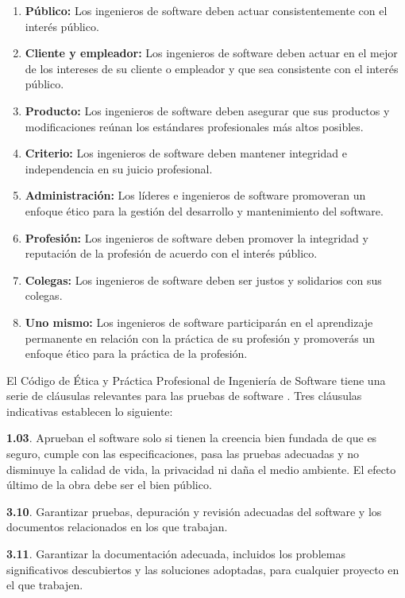 \documentclass[twoside]{article}
\begin{document}
\begin{multicols}{2}
\begin{enumerate}
\item \textbf{Público:} Los ingenieros de software deben actuar consistentemente
con el interés público.
\item \textbf{Cliente y empleador:} Los ingenieros de software deben actuar en
el mejor de los intereses de su cliente o empleador y que sea consistente con el
interés público.
\item \textbf{Producto:} Los ingenieros de software deben asegurar que sus
productos y modificaciones reúnan los estándares profesionales más altos
posibles.
\item \textbf{Criterio:} Los ingenieros de software deben mantener integridad e
independencia en su juicio profesional.
\item \textbf{Administración:} Los líderes e ingenieros de software promoveran
un enfoque ético para la gestión del desarrollo y mantenimiento del software.
\item \textbf{Profesión:} Los ingenieros de software deben promover la
integridad y reputación de la profesión de acuerdo con el interés público.
\item \textbf{Colegas:} Los ingenieros de software deben ser justos y solidarios
con sus colegas.
\item \textbf{Uno mismo:} Los ingenieros de software participarán en el
aprendizaje permanente en relación con la práctica de su profesión y promoverás
un enfoque ético para la práctica de la profesión.
\end{enumerate}


El Código de Ética y Práctica Profesional de Ingeniería de Software tiene una
serie de cláusulas relevantes para las pruebas de software
\cite{rogerson2002software}. Tres cláusulas indicativas establecen lo siguiente:

\textbf{1.03}. Aprueban el software solo si tienen la creencia bien fundada de que es
seguro, cumple con las especificaciones, pasa las pruebas adecuadas y no
disminuye la calidad de vida, la privacidad ni daña el medio ambiente. El efecto
último de la obra debe ser el bien público.

\textbf{3.10}. Garantizar pruebas, depuración y revisión adecuadas del software
y los documentos relacionados en los que trabajan.

\textbf{3.11}. Garantizar la documentación adecuada, incluidos los problemas
significativos descubiertos y las soluciones adoptadas, para cualquier proyecto
en el que trabajen. \\
\\


\end{multicols}
\end{document}
